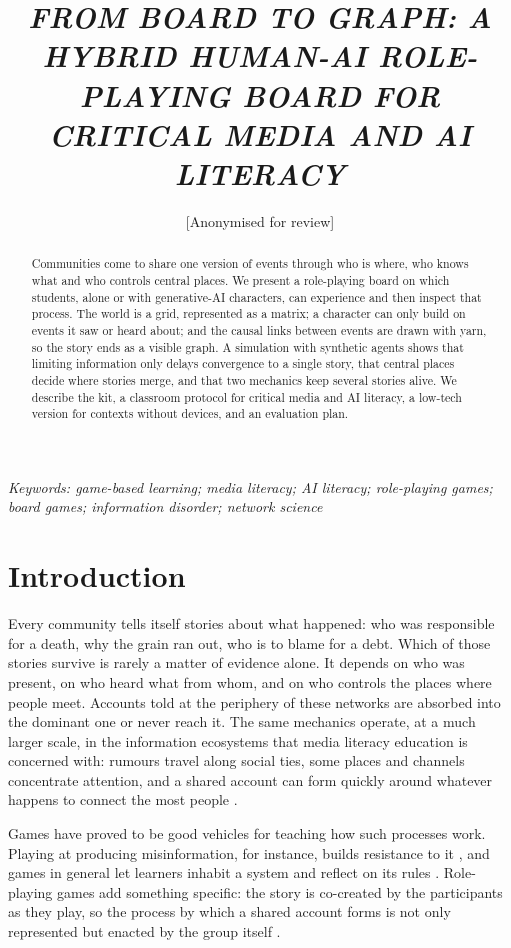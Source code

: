 \documentclass[12pt]{article}
\title{\textbf{\textit{FROM BOARD TO GRAPH: A HYBRID HUMAN-AI ROLE-PLAYING BOARD FOR CRITICAL MEDIA AND AI LITERACY}}}
\author{[Anonymised for review]}
\date{}
\begin{document}
\maketitle
\thispagestyle{fancy}

\begin{abstract}
\noindent
Communities come to share one version of events through who is where, who
knows what and who controls central places. We present a role-playing board
on which students, alone or with generative-AI characters, can experience
and then inspect that process. The world is a grid, represented as a
matrix; a character can only build on events it saw or heard about; and the
causal links between events are drawn with yarn, so the story ends as a
visible graph. A simulation with synthetic agents shows that limiting
information only delays convergence to a single story, that central places
decide where stories merge, and that two mechanics keep several stories
alive. We describe the kit, a classroom protocol for critical media and AI
literacy, a low-tech version for contexts without devices, and an
evaluation plan.
\end{abstract}

\noindent\textit{Keywords: game-based learning; media literacy; AI literacy; role-playing games; board games; information disorder; network science}

\section{Introduction}

Every community tells itself stories about what happened: who was
responsible for a death, why the grain ran out, who is to blame for a debt.
Which of those stories survive is rarely a matter of evidence alone. It
depends on who was present, on who heard what from whom, and on who
controls the places where people meet. Accounts told at the periphery of
these networks are absorbed into the dominant one or never reach it. The
same mechanics operate, at a much larger scale, in the information
ecosystems that media literacy education is concerned with: rumours travel
along social ties, some places and channels concentrate attention, and a
shared account can form quickly around whatever happens to connect the most
people \parencite{wardle2017,hobbs2010}.

Games have proved to be good vehicles for teaching how such processes work.
Playing at producing misinformation, for instance, builds resistance to it
\parencite{roozenbeek2019,basol2020}, and games in general let learners
inhabit a system and reflect on its rules \parencite{gee2003,flanagan2009}.
Role-playing games add something specific: the story is co-created by the
participants as they play, so the process by which a shared account forms
is not only represented but enacted by the group itself
\parencite{fine1983,montola2008,bowman2010,daniau2016}.
\end{document}
